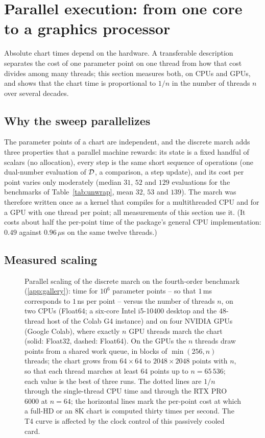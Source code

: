 \section{Parallel execution: from one core to a graphics processor}\label{sec:parallel}

Absolute chart times depend on the hardware. A transferable description
separates the cost of one parameter point on one thread from how that cost
divides among many threads; this section measures both, on CPUs and GPUs,
and shows that the chart time is proportional to $1/n$ in the number of
threads $n$ over several decades.

\subsection{Why the sweep parallelizes}\label{sec:parallel-why}

The parameter points of a chart are independent, and the discrete march adds
three properties that a parallel machine rewards: its state is a fixed handful
of scalars (no allocation), every step is the same short sequence of
operations (one dual-number evaluation of $\mathcal{D}$, a comparison, a step
update), and its cost per point varies only moderately (median $31$, $52$ and
$129$ evaluations for the benchmarks of Table~\ref{tab:unwrap}, mean $32$,
$53$ and $139$). The march was therefore written once as a
 kernel that compiles for a multithreaded CPU and
for a GPU with one thread per point; all measurements of this section use it.
(It costs about half the per-point time of the package's general CPU
implementation: $0.49$ against $0.96\,\mu$s on the same twelve threads.)

\subsection{Measured scaling}\label{sec:parallel-scaling}

\begin{figure}[tb]
  \centering
  \caption{Parallel scaling of the discrete march on the fourth-order benchmark
  (\ref{app:gallery}): time for $10^{6}$ parameter points -- so that
  $1$\,ms corresponds to $1$\,ns per point -- versus the number of threads $n$,
  on two CPUs (Float64; a six-core Intel i5-10400 desktop and the $48$-thread
  host of the Colab G4 instance) and on four NVIDIA GPUs (Google Colab), where
  exactly $n$ GPU threads march the chart (solid: Float32, dashed: Float64). On
  the GPUs the $n$ threads draw points from a shared work queue, in blocks of
  $\min(256,n)$ threads; the chart grows from $64\times64$ to
  $2048\times2048$ points with $n$, so that each thread marches at least $64$
  points up to $n=65\,536$; each value is the best of three runs. The dotted
  lines are $1/n$ through the single-thread CPU time and through the
  RTX PRO 6000 at $n=64$; the horizontal lines mark the per-point cost at which
  a full-HD or an 8K chart is computed thirty times per second. The T4 curve is
  affected by the clock control of this passively cooled card.}\label{fig:parallel}
\end{figure}

